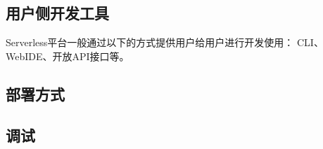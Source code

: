 \subsection{用户侧开发工具}
Serverless平台一般通过以下的方式提供用户给用户进行开发使用：
CLI、WebIDE、开放API接口等。


\subsection{部署方式}
\subsection{调试}